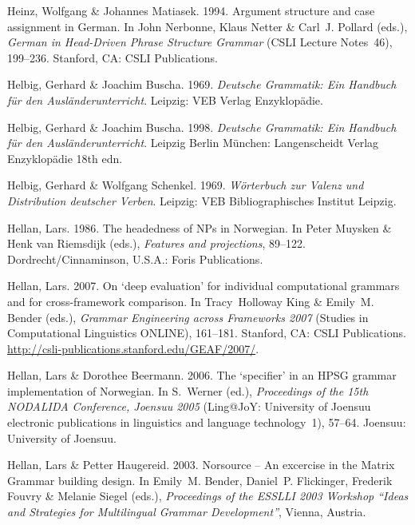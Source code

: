 \begin{thebibliography}{1420}
Heinz, Wolfgang \& Johannes Matiasek. 1994.
\newblock Argument structure and case assignment in {German}.
\newblock In John Nerbonne, Klaus Netter \& Carl~J. Pollard (eds.),
  \emph{German in {Head-Driven Phrase Structure Grammar}} (CSLI Lecture
  Notes~46), 199--236. Stanford, CA: CSLI Publications.

Helbig, Gerhard \& Joachim Buscha. 1969.
\newblock \emph{{Deutsche Grammatik: Ein Handbuch f{\"u}r den
  Aus\-l{\"a}n\-der\-unter\-richt}}.
\newblock Leipzig: VEB Verlag Enzyklop{\"a}die.

Helbig, Gerhard \& Joachim Buscha. 1998.
\newblock \emph{{Deutsche Grammatik: Ein Handbuch f{\"u}r den
  Aus\-l{\"a}n\-der\-unter\-richt}}.
\newblock Leipzig Berlin M{\"u}nchen: Langenscheidt Verlag Enzyklop{\"a}die
  18th edn.

Helbig, Gerhard \& Wolfgang Schenkel. 1969.
\newblock \emph{{W{\"o}rterbuch zur Valenz und Distribution deutscher Verben}}.
\newblock Leipzig: VEB Bibliographisches Institut Leipzig.

Hellan, Lars. 1986.
\newblock The headedness of {NPs} in {Norwegian}.
\newblock In Peter Muysken \& {Henk van} Riemsdijk (eds.), \emph{Features and
  projections}, 89--122. Dordrecht/Cinnaminson, U.S.A.: Foris Publications.

Hellan, Lars. 2007.
\newblock On `deep evaluation' for individual computational grammars and for
  cross-framework comparison.
\newblock In Tracy~Holloway King \& Emily~M. Bender (eds.), \emph{{Grammar
  Engineering across Frameworks 2007}}  (Studies in Computational Linguistics
  ONLINE), 161--181. Stanford, CA: CSLI Publications.
\newblock \urlprefix\url{http://csli-publications.stanford.edu/GEAF/2007/}.

Hellan, Lars \& Dorothee Beermann. 2006.
\newblock The `specifier' in an {HPSG} grammar implementation of {Norwegian}.
\newblock In S.~Werner (ed.), \emph{Proceedings of the {15th NODALIDA
  Conference, Joensuu 2005}} (Ling@JoY: University of Joensuu electronic
  publications in linguistics and language technology~1), 57--64. Joensuu:
  University of Joensuu.

Hellan, Lars \& Petter Haugereid. 2003.
\newblock Norsource -- {An} excercise in the {Matrix Grammar} building design.
\newblock In Emily~M. Bender, Daniel~P. Flickinger, Frederik Fouvry \& Melanie
  Siegel (eds.), \emph{Proceedings of the {ESSLLI 2003 Workshop ``Ideas and
  Strategies for Multilingual Grammar Development''}}, Vienna, Austria.


\end{thebibliography}
